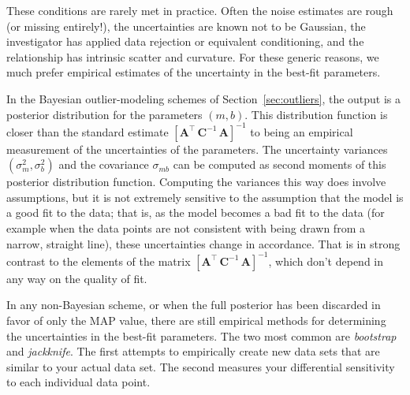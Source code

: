 \documentclass[12pt,twoside]{article}
\newcommand{\sectionname}{Section}
\newcommand{\mmatrix}[1]{\boldsymbol{#1}}
\newcommand{\inverse}[1]{{#1}^{-1}}
\newcommand{\transpose}[1]{{#1}^{\scriptscriptstyle \top}}
\newcommand{\mA}{\mmatrix{A}}
\newcommand{\mAT}{\transpose{\mA}}
\newcommand{\mC}{\mmatrix{C}}
\newcommand{\mCinv}{\inverse{\mC}}
\begin{document}
These conditions are rarely met in practice.  Often the noise
estimates are rough (or missing entirely!), the uncertainties are
known not to be Gaussian, the investigator has applied data rejection
or equivalent conditioning, and the relationship has intrinsic scatter
and curvature.  For these generic reasons, we much prefer empirical
estimates of the uncertainty in the best-fit parameters.

In the Bayesian outlier-modeling schemes of
\sectionname~\ref{sec:outliers}, the output is a
posterior distribution for the parameters $(m,b)$.  This distribution
function is closer than the standard estimate
$\inverse{\left[\mAT\,\mCinv\,\mA\right]}$ to being an
empirical measurement of the uncertainties of the parameters.  The
uncertainty variances $(\sigma_m^2,\sigma_b^2)$ and the covariance
$\sigma_{mb}$ can be computed as second moments of this posterior
distribution function.  Computing the variances this way does involve
assumptions, but it is not extremely sensitive to the assumption that
the model is a good fit to the data; that is, as the model becomes a
bad fit to the data (for example when the data points are not
consistent with being drawn from a narrow, straight line), these
uncertainties change in accordance.  That is in strong contrast to the
elements of the matrix $\inverse{\left[\mAT\,\mCinv\,\mA\right]}$,
which don't depend in any way on the quality of fit.

In any non-Bayesian scheme, or when the full posterior has been
discarded in favor of only the MAP value, there are still empirical
methods for determining the uncertainties in the best-fit parameters.
The two most common are \emph{bootstrap} and \emph{jackknife}.  The
first attempts to empirically create new data sets that are similar to
your actual data set.  The second measures your differential
sensitivity to each individual data point.
\end{document}
